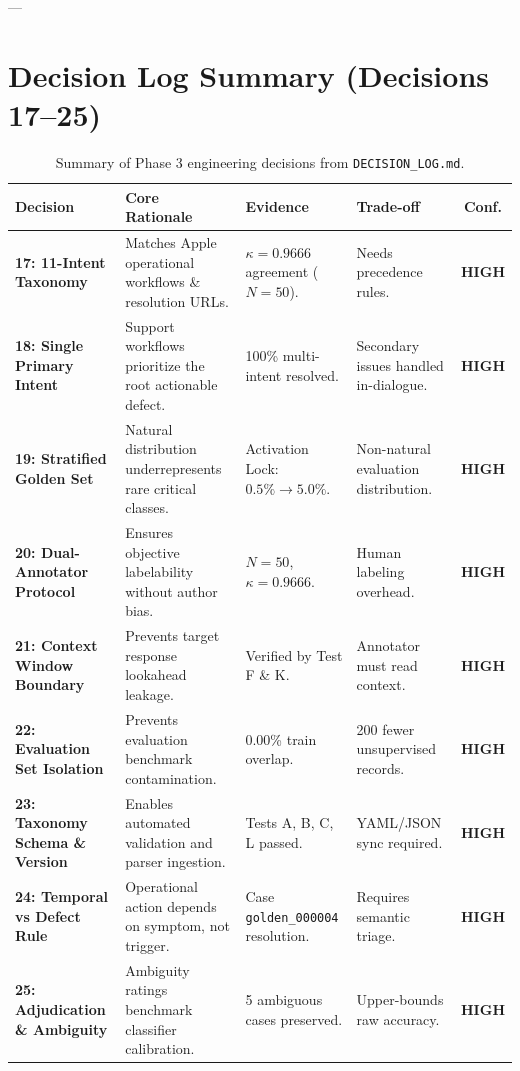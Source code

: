 \documentclass[11pt,a4paper]{article}
\begin{document}
---

\section{Decision Log Summary (Decisions 17--25)}

\begin{table}[ht]
\centering
\small
\begin{tabularx}{\textwidth}{lp{4cm}p{4cm}p{3cm}c}
\toprule
\textbf{Decision} & \textbf{Core Rationale} & \textbf{Evidence} & \textbf{Trade-off} & \textbf{Conf.} \\
\midrule
\textbf{17: 11-Intent Taxonomy} & Matches Apple operational workflows \& resolution URLs. & $\kappa = 0.9666$ agreement ($N=50$). & Needs precedence rules. & \textbf{HIGH} \\
\textbf{18: Single Primary Intent} & Support workflows prioritize the root actionable defect. & 100\% multi-intent resolved. & Secondary issues handled in-dialogue. & \textbf{HIGH} \\
\textbf{19: Stratified Golden Set} & Natural distribution underrepresents rare critical classes. & Activation Lock: $0.5\% \rightarrow 5.0\%$. & Non-natural evaluation distribution. & \textbf{HIGH} \\
\textbf{20: Dual-Annotator Protocol} & Ensures objective labelability without author bias. & $N=50$, $\kappa = 0.9666$. & Human labeling overhead. & \textbf{HIGH} \\
\textbf{21: Context Window Boundary} & Prevents target response lookahead leakage. & Verified by Test F \& K. & Annotator must read context. & \textbf{HIGH} \\
\textbf{22: Evaluation Set Isolation} & Prevents evaluation benchmark contamination. & 0.00\% train overlap. & 200 fewer unsupervised records. & \textbf{HIGH} \\
\textbf{23: Taxonomy Schema \& Version} & Enables automated validation and parser ingestion. & Tests A, B, C, L passed. & YAML/JSON sync required. & \textbf{HIGH} \\
\textbf{24: Temporal vs Defect Rule} & Operational action depends on symptom, not trigger. & Case \texttt{golden\_000004} resolution. & Requires semantic triage. & \textbf{HIGH} \\
\textbf{25: Adjudication \& Ambiguity} & Ambiguity ratings benchmark classifier calibration. & 5 ambiguous cases preserved. & Upper-bounds raw accuracy. & \textbf{HIGH} \\
\bottomrule
\end{tabularx}
\caption{Summary of Phase 3 engineering decisions from \texttt{DECISION\_LOG.md}.}
\label{tab:decision_log}
\end{table}
\end{document}
